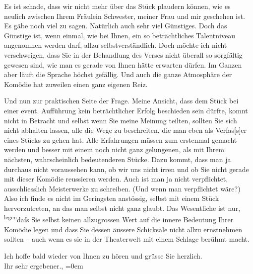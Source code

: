 \pstart
           {\pb}Es ist schade, dass wir nicht mehr über das Stück plaudern können, wie es
               neulich zwischen Ihrem Fräulein Schwester, meiner Frau und mir geschehen ist. Es gäbe noch viel zu sagen. Natürlich auch sehr
               viel Günstiges. Doch das Günstige ist, wenn einmal, wie bei Ihnen, ein so
               beträchtliches Talentniveau angenomnen werden darf, allzu selbstverständlich. Doch
               möchte ich nicht verschweigen, dass Sie in der Behandlung des Verses nicht überall so
               sorgfältig gewesen sind, wie man es gerade von Ihnen hätte erwarten dürfen. Im Ganzen
               aber läuft die Sprache höchst gefällig. Und auch die ganze Atmosphäre der Komödie hat
               zuweilen einen ganz eigenen Reiz.\pend
           
\pstart
           Und nun zur praktischen Seite der Frage. Meine Ansicht, dass dem Stück bei einer event. Aufführung kein
               beträchtlicher Erfolg beschieden sein dürfte, komnt nicht in Betracht und selbst wenn
               Sie meine Meinung teilten, sollten Sie sich nicht abhalten lassen, alle die Wege zu
               beschreiten, die man eben als Verfas{[}s{]}er eines Stücks zu gehen
               hat. Alle Erfahrungen müssen zum {\pb}erstenmal gemacht
               werden und besser mit einem noch nicht ganz gelungenen, als mit Ihrem nächsten,
               wahrscheinlich bedeutenderen Stücke. Dazu kommt, dass man ja durchaus nicht
               voraussehen kann, ob wir uns nicht irren und ob Sie nicht gerade mit dieser Komödie
                  reussieren werden. Auch ist man ja nicht
               verpflichtet, ausschliesslich Meisterwerke zu schreiben. (Und wenn man verpflichtet
               wäre?) Also ich finde es nicht im Geringsten anstössig, selbst mit einem Stück
               hervorzutreten, an das man selbst nicht ganz glaubt. Das Wesentliche ist nur, \substVorne{}\textsuperscript{legen}\substDazwischen{}daſs\substHinten{} Sie selbst keinen allzugrossen Wert auf die innere Bedeutung Ihrer Komödie legen und dass Sie
               dessen äussere Schicksale nicht allzu ernstnehmen sollten – auch wenn es sie in der
               Theaterwelt mit einem Schlage berühmt macht.\pend
           
\pstart
           Ich hoffe bald wieder von Ihnen zu hören und grüsse Sie herzlich.{\\[\baselineskip]} Ihr sehr
               ergebener.,\pend
           \leftskip=0em{}\endnumbering{}  
      
